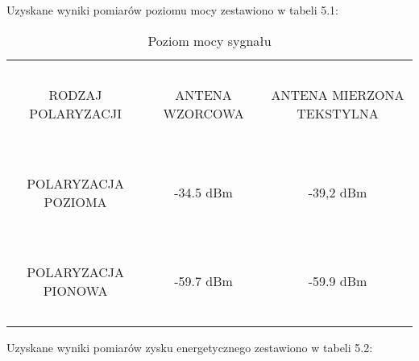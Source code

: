 \noindent
\newline Uzyskane wyniki pomiarów poziomu mocy zestawiono w tabeli 5.1:


\begin{table}[h!]
\begin{center}
    \begin{tabular}{|c|c|c|}
    \hline
    ~                     & ~               & ~                         \\
     RODZAJ POLARYZACJI    & ANTENA WZORCOWA & ANTENA MIERZONA TEKSTYLNA \\
    ~                     & ~               & ~                         \\ \hline
    ~                     & ~               & ~                         \\
     POLARYZACJA POZIOMA  & -34.5 dBm       & -39,2 dBm                 \\
    ~                     & ~               & ~                         \\ \hline
    ~                     & ~               & ~                         \\
     POLARYZACJA PIONOWA  & -59.7 dBm       & -59.9 dBm                 \\
    ~                     & ~               & ~                         \\ \hline
    \end{tabular}
    \caption{Poziom mocy sygnału}
\end{center}
\end{table}

\newpage
\noindent
\newline Uzyskane wyniki pomiarów zysku energetycznego zestawiono w tabeli 5.2:


